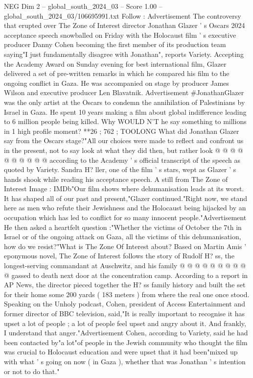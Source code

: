 \begin{textsample}{NEG Dim 2 – global\_south\_2024\_03 – Score 1.00 – global\_south\_2024\_03/106695991.txt}  \label{ex:f2_neg_436}
Follow : Advertisement The controversy that erupted over The Zone of Interest director Jonathan Glazer ' s Oscars 2024 acceptance speech snowballed on Friday with the Holocaust film ' s executive producer Danny Cohen becoming the first member of its production team saying"I just fundamentally disagree with Jonathan", reports Variety.
Accepting the Academy Award on Sunday evening for best international film, Glazer delivered a set of pre-written remarks in which he compared his film to the ongoing conflict in Gaza.
He was accompanied on stage by producer James Wilson and executive producer Len Blavatnik.
Advertisement \#JonathanGlazer was the only artist at the Oscars to condemn the annihilation of Palestinians by Israel in Gaza.
He spent 10 years making a film about global indifference leading to 6 million people being killed.
Why WOULD N'T he say something to millions in 1 high profile moment? **26 ; 762 ; TOOLONG What did Jonathan Glazer say from the Oscars stage?"All our choices were made to reflect and confront us in the present, not to say look at what they did then, but rather look @ @ @ @ @ @ @ @ @ @ according to the Academy ' s official transcript of the speech as quoted by Variety.
Sandra H? ller, one of the film ' s stars, wept as Glazer ' s hands shook while reading his acceptance speech.
A still from The Zone of Interest Image : IMDb"Our film shows where dehumanisation leads at its worst.
It has shaped all of our past and present,"Glazer continued."Right now, we stand here as men who refute their Jewishness and the Holocaust being hijacked by an occupation which has led to conflict for so many innocent people."Advertisement He then asked a heartfelt question :"Whether the victims of October the 7th in Israel or of the ongoing attack on Gaza, all the victims of this dehumanisation, how do we resist?"What is The Zone Of Interest about?
Based on Martin Amis ' eponymous novel, The Zone of Interest follows the story of Rudolf H? ss, the longest-serving commandant at Auschwitz, and his family @ @ @ @ @ @ @ @ @ @ gassed to death next door at the concentration camp.
According to a report in AP News, the director pieced together the H? ss family history and built the set for their home some 200 yards ( 183 meters ) from where the real one once stood.
Speaking on the Unholy podcast, Cohen, president of Access Entertainment and former director of BBC television, said,"It is really important to recognise it has upset a lot of people ; a lot of people feel upset and angry about it.
And frankly, I understand that anger."Advertisement Cohen, according to Variety, said he had been contacted by"a lot"of people in the Jewish community who thought the film was crucial to Holocaust education and were upset that it had been"mixed up with what ' s going on now ( in Gaza ), whether that was Jonathan ' s intention or not to do that."

\end{textsample}
